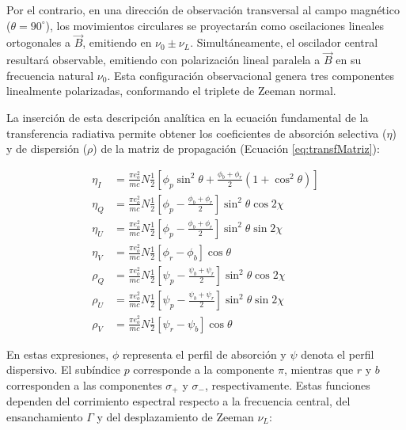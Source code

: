 Por el contrario, en una dirección de observación transversal al campo magnético ($\theta = 90^\circ$), los movimientos circulares se proyectarán como oscilaciones lineales ortogonales a $\vec{B}$, emitiendo en $\nu_0 \pm \nu_L$. Simultáneamente, el oscilador central resultará observable, emitiendo con polarización lineal paralela a $\vec{B}$ en su frecuencia natural $\nu_0$. Esta configuración observacional genera tres componentes linealmente polarizadas, conformando el triplete de Zeeman normal.

La inserción de esta descripción analítica en la ecuación fundamental de la transferencia radiativa permite obtener los coeficientes de absorción selectiva ($\eta$) y de dispersión ($\rho$) de la matriz de propagación (Ecuación \ref{eq:transfMatriz}):

\begin{equation}
    \label{eq:solEtaRho}
\begin{aligned}
\eta_I &= \frac{\pi e_o^2}{m c} N \frac{1}{2} \left[ \phi_p \sin^2 \theta + \frac{\phi_b + \phi_r}{2} (1 + \cos^2 \theta) \right] \\[4pt]
\eta_Q &= \frac{\pi e_o^2}{m c} N \frac{1}{2} \left[ \phi_p - \frac{\phi_b + \phi_r}{2} \right] \sin^2 \theta \cos 2\chi \\[4pt]
\eta_U &= \frac{\pi e_o^2}{m c} N \frac{1}{2} \left[ \phi_p - \frac{\phi_b + \phi_r}{2} \right] \sin^2 \theta \sin 2\chi \\[4pt]
\eta_V &= \frac{\pi e_o^2}{m c} N \frac{1}{2} [\phi_r - \phi_b] \cos \theta \\[12pt]
\rho_Q &= \frac{\pi e_o^2}{m c} N \frac{1}{2} \left[ \psi_p - \frac{\psi_b + \psi_r}{2} \right] \sin^2 \theta \cos 2\chi \\[4pt]
\rho_U &= \frac{\pi e_o^2}{m c} N \frac{1}{2} \left[ \psi_p - \frac{\psi_b + \psi_r}{2} \right] \sin^2 \theta \sin 2\chi \\[4pt]
\rho_V &= \frac{\pi e_o^2}{m c} N \frac{1}{2} [\psi_r - \psi_b] \cos \theta \, 
\end{aligned}
\end{equation}

En estas expresiones, $\phi$ representa el perfil de absorción y $\psi$ denota el perfil dispersivo. El subíndice $p$ corresponde a la componente $\pi$, mientras que $r$ y $b$ corresponden a las componentes $\sigma_+$ y $\sigma_-$, respectivamente. Estas funciones dependen del corrimiento espectral respecto a la frecuencia central, del ensanchamiento $\Gamma$ y del desplazamiento de Zeeman $\nu_L$:

